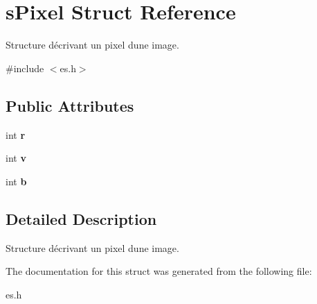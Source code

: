 \hypertarget{structs_pixel}{}\section{s\+Pixel Struct Reference}
\label{structs_pixel}


Structure décrivant un pixel d\textquotesingle{}une image.  




{\ttfamily \#include $<$es.\+h$>$}

\subsection*{Public Attributes}
\begin{DoxyCompactItemize}
\item 
\mbox{\label{structs_pixel_ac3c26bdba7b18fa49fef852d541fa03e}} 
int {\bfseries r}
\item 
\mbox{\label{structs_pixel_a95838ecdec0ab8ef4c09340763b09040}} 
int {\bfseries v}
\item 
\mbox{\label{structs_pixel_a17afc2137cca0a7d025256c9577907c2}} 
int {\bfseries b}
\end{DoxyCompactItemize}


\subsection{Detailed Description}
Structure décrivant un pixel d\textquotesingle{}une image. 

The documentation for this struct was generated from the following file\+:\begin{DoxyCompactItemize}
\item 
es.\+h\end{DoxyCompactItemize}

